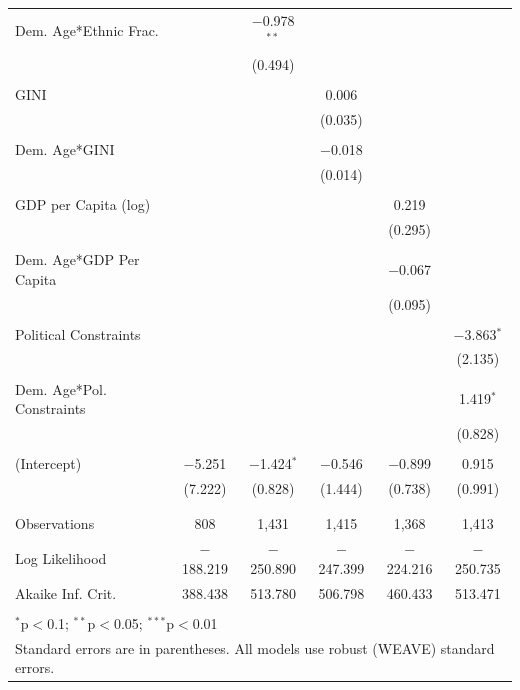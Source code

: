 \documentclass[a4paper]{article}\usepackage[]{graphicx}\usepackage[]{color}
\begin{document}
\begin{table}
\begin{center}
{\begin{tabular}{@{\extracolsep{5pt}}lccccc}
 Dem. Age*Ethnic Frac. &  & $-$0.978$^{**}$ &  &  &  \\ 
  &  & (0.494) &  &  &  \\ 
  & & & & & \\ 
 GINI &  &  & 0.006 &  &  \\ 
  &  &  & (0.035) &  &  \\ 
  & & & & & \\ 
 Dem. Age*GINI &  &  & $-$0.018 &  &  \\ 
  &  &  & (0.014) &  &  \\ 
  & & & & & \\ 
 GDP per Capita (log) &  &  &  & 0.219 &  \\ 
  &  &  &  & (0.295) &  \\ 
  & & & & & \\ 
 Dem. Age*GDP Per Capita &  &  &  & $-$0.067 &  \\ 
  &  &  &  & (0.095) &  \\ 
  & & & & & \\ 
 Political Constraints &  &  &  &  & $-$3.863$^{*}$ \\ 
  &  &  &  &  & (2.135) \\ 
  & & & & & \\ 
 Dem. Age*Pol. Constraints &  &  &  &  & 1.419$^{*}$ \\ 
  &  &  &  &  & (0.828) \\ 
  & & & & & \\ 
 (Intercept) & $-$5.251 & $-$1.424$^{*}$ & $-$0.546 & $-$0.899 & 0.915 \\ 
  & (7.222) & (0.828) & (1.444) & (0.738) & (0.991) \\ 
  & & & & & \\ 
\hline \\[-1.8ex] 
Observations & 808 & 1,431 & 1,415 & 1,368 & 1,413 \\ 
Log Likelihood & $-$188.219 & $-$250.890 & $-$247.399 & $-$224.216 & $-$250.735 \\ 
Akaike Inf. Crit. & 388.438 & 513.780 & 506.798 & 460.433 & 513.471 \\ 
\hline 
\hline \\[-1.8ex] 
\multicolumn{6}{l}{$^{*}$p$<$0.1; $^{**}$p$<$0.05; $^{***}$p$<$0.01} \\ 
\multicolumn{6}{l}{Standard errors are in parentheses. All models use robust (WEAVE) standard errors.} \\ 
\end{tabular} 

    }
    \end{center}
\end{table}
\end{document}
